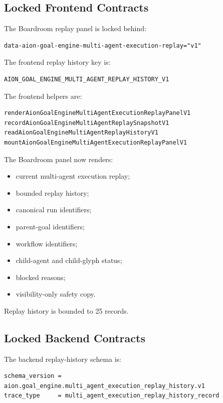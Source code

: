 \subsection{Locked Frontend Contracts}

The Boardroom replay panel is locked behind:

\begin{verbatim}
data-aion-goal-engine-multi-agent-execution-replay="v1"
\end{verbatim}

The frontend replay history key is:

\begin{verbatim}
AION_GOAL_ENGINE_MULTI_AGENT_REPLAY_HISTORY_V1
\end{verbatim}

The frontend helpers are:

\begin{verbatim}
renderAionGoalEngineMultiAgentExecutionReplayPanelV1
recordAionGoalEngineMultiAgentReplaySnapshotV1
readAionGoalEngineMultiAgentReplayHistoryV1
mountAionGoalEngineMultiAgentExecutionReplayPanelV1
\end{verbatim}

The Boardroom panel now renders:

\begin{itemize}
  \item current multi-agent execution replay;
  \item bounded replay history;
  \item canonical run identifiers;
  \item parent-goal identifiers;
  \item workflow identifiers;
  \item child-agent and child-glyph status;
  \item blocked reasons;
  \item visibility-only safety copy.
\end{itemize}

Replay history is bounded to 25 records.

\subsection{Locked Backend Contracts}

The backend replay-history schema is:

\begin{verbatim}
schema_version = aion.goal_engine.multi_agent_execution_replay_history.v1
trace_type     = multi_agent_execution_replay_history_record
\end{verbatim}

